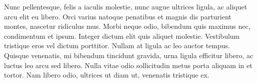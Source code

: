Nunc pellentesque, felis a iaculis molestie, nunc augue ultrices ligula, ac aliquet arcu elit eu libero. Orci varius natoque penatibus et magnis dis parturient montes, nascetur ridiculus mus. Morbi neque odio, bibendum quis maximus nec, condimentum et ipsum. Integer dictum elit quis aliquet molestie. Vestibulum tristique eros vel dictum porttitor. Nullam at ligula ac leo auctor tempus. Quisque venenatis, mi bibendum tincidunt gravida, urna ligula efficitur libero, ac luctus leo arcu sed libero. Nulla vitae odio sollicitudin metus porta aliquam in et tortor. Nam libero odio, ultrices ut diam ut, venenatis tristique ex.